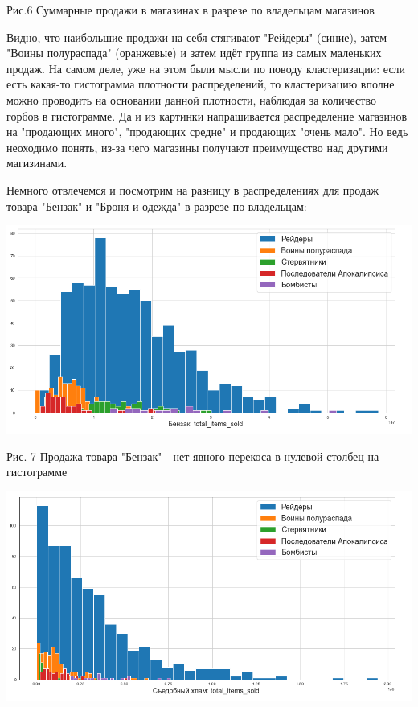 \documentclass[%
10pt, %
final, %
oneside, %
onecolumn, %
centertags]{article} %
\theoremstyle{plain}
\theoremstyle{definition}
\theoremstyle{remark}
\begin{document}
\begin{itemize}
\begin{center}
 	Рис.6 Суммарные продажи в магазинах в разрезе по владельцам магазинов
	\end{center}
 	Видно, что наибольшие продажи на себя стягивают "Рейдеры" (синие), затем "Воины полураспада" (оранжевые) и затем идёт группа из самых маленьких продаж. На самом деле, уже на этом были мысли по поводу кластеризации: если есть какая-то гистограмма плотности распределений, то кластеризацию вполне можно проводить на основании данной плотности, наблюдая за количество горбов в гистограмме. Да и из картинки напрашивается распределение магазинов на "продающих много", "продающих средне" и продающих "очень мало". Но ведь неоходимо понять, из-за чего магазины получают преимущество над другими магизинами.

 	Немного отвлечемся и посмотрим на разницу в распределениях для продаж товара "Бензак" и "Броня и одежда" в разрезе по владельцам:
 	\begin{center}
	\includegraphics[scale=0.35]{7.png}

 	Рис. 7 Продажа товара "Бензак" - нет явного перекоса в нулевой столбец на гистограмме
	\end{center}
	\begin{center}
	\includegraphics[scale=0.35]{8.png}


\end{center}
\end{itemize}
\end{document}
